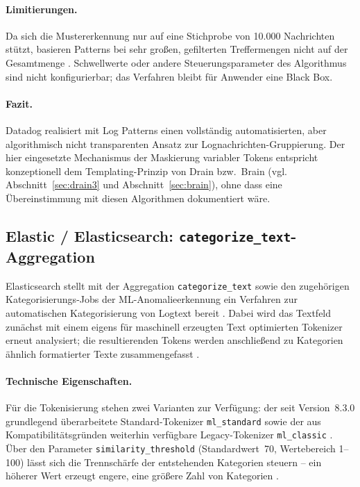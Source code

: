 \paragraph{Limitierungen.}
Da sich die Mustererkennung nur auf eine Stichprobe von 10.000 Nachrichten stützt, basieren Patterns bei sehr großen, gefilterten Treffermengen nicht auf der Gesamtmenge \cite{datadogLogPatternsDocs}. Schwellwerte oder andere Steuerungsparameter des Algorithmus sind nicht konfigurierbar; das Verfahren bleibt für Anwender eine Black Box.

\paragraph{Fazit.}
Datadog realisiert mit Log Patterns einen vollständig automatisierten, aber algorithmisch nicht transparenten Ansatz zur Lognachrichten-Gruppierung. Der hier eingesetzte Mechanismus der Maskierung variabler Tokens entspricht konzeptionell dem Templating-Prinzip von Drain bzw.\ Brain (vgl. Abschnitt~\ref{sec:drain3} und Abschnitt~\ref{sec:brain}), ohne dass eine Übereinstimmung mit diesen Algorithmen dokumentiert wäre.

\subsection{Elastic / Elasticsearch: \texttt{categorize\_text}-Aggregation}
\label{sec:elastic_categorize}

Elasticsearch stellt mit der Aggregation \texttt{categorize\_text} sowie den zugehörigen Kategorisierungs-Jobs der \ac{ML}-Anomalieerkennung ein Verfahren zur automatischen Kategorisierung von Logtext bereit \cite{elasticCategorizeTextAgg}. Dabei wird das Textfeld zunächst mit einem eigens für maschinell erzeugten Text optimierten Tokenizer erneut analysiert; die resultierenden Tokens werden anschließend zu Kategorien ähnlich formatierter Texte zusammengefasst \cite{elasticCategorizeTextAgg}.

\paragraph{Technische Eigenschaften.}
Für die Tokenisierung stehen zwei Varianten zur Verfügung: der seit Version~8.3.0 grundlegend überarbeitete Standard-Tokenizer \texttt{ml\_standard} sowie der aus Kompatibilitätsgründen weiterhin verfügbare Legacy-Tokenizer \texttt{ml\_classic} \cite{elasticCategorizeTextAgg}. Über den Parameter \texttt{similarity\_threshold} (Standardwert~70, Wertebereich 1--100) lässt sich die Trennschärfe der entstehenden Kategorien steuern -- ein höherer Wert erzeugt engere, eine größere Zahl von Kategorien \cite{elasticCategorizeTextAgg}.

